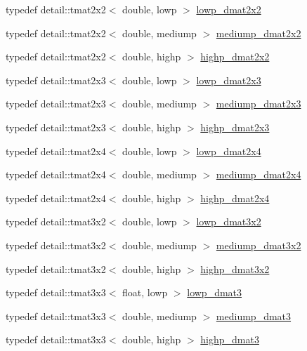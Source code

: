\begin{CompactItemize}
typedef detail::tmat2x2$<$ double, lowp $>$ \hyperlink{group__core__precision_g68b486ff22814c1a3781378513a9fcc0}{lowp\_\-dmat2x2}
\item 
typedef detail::tmat2x2$<$ double, mediump $>$ \hyperlink{group__core__precision_g88ddb4188060ab00fee67c9840f4417e}{mediump\_\-dmat2x2}
\item 
typedef detail::tmat2x2$<$ double, highp $>$ \hyperlink{group__core__precision_ga5e35f6570d394c1cd34f411a473220c}{highp\_\-dmat2x2}
\item 
typedef detail::tmat2x3$<$ double, lowp $>$ \hyperlink{group__core__precision_g2c7432984a35cf72050870a54485ef35}{lowp\_\-dmat2x3}
\item 
typedef detail::tmat2x3$<$ double, mediump $>$ \hyperlink{group__core__precision_g734e988edf759c7012c443014acb6674}{mediump\_\-dmat2x3}
\item 
typedef detail::tmat2x3$<$ double, highp $>$ \hyperlink{group__core__precision_gfec7367665f006f2a7643103c5eddc38}{highp\_\-dmat2x3}
\item 
typedef detail::tmat2x4$<$ double, lowp $>$ \hyperlink{group__core__precision_gc2285cef559b0dc35cb9a7f22e6a2dd8}{lowp\_\-dmat2x4}
\item 
typedef detail::tmat2x4$<$ double, mediump $>$ \hyperlink{group__core__precision_gdb60bf60ef2b8da4a28a372b2bcca3a3}{mediump\_\-dmat2x4}
\item 
typedef detail::tmat2x4$<$ double, highp $>$ \hyperlink{group__core__precision_gcd51d8188f7d66a83c035b8c4cd69f2d}{highp\_\-dmat2x4}
\item 
typedef detail::tmat3x2$<$ double, lowp $>$ \hyperlink{group__core__precision_g678c21e4fadeda255cfb146d40844bdd}{lowp\_\-dmat3x2}
\item 
typedef detail::tmat3x2$<$ double, mediump $>$ \hyperlink{group__core__precision_gff0060984716bcda68ff69ed27536bf6}{mediump\_\-dmat3x2}
\item 
typedef detail::tmat3x2$<$ double, highp $>$ \hyperlink{group__core__precision_gc956fe6b946f0ccee78367ccd5427351}{highp\_\-dmat3x2}
\item 
typedef detail::tmat3x3$<$ float, lowp $>$ \hyperlink{group__core__precision_g07d9423bdde2d7ff880d6ece01dc9e32}{lowp\_\-dmat3}
\item 
typedef detail::tmat3x3$<$ double, mediump $>$ \hyperlink{group__core__precision_g80600af2c1ca11ead6123777185c372d}{mediump\_\-dmat3}
\item 
typedef detail::tmat3x3$<$ double, highp $>$ \hyperlink{group__core__precision_g993461e1d2caf19abd4f64d02ccdafa9}{highp\_\-dmat3}

\end{CompactItemize}
